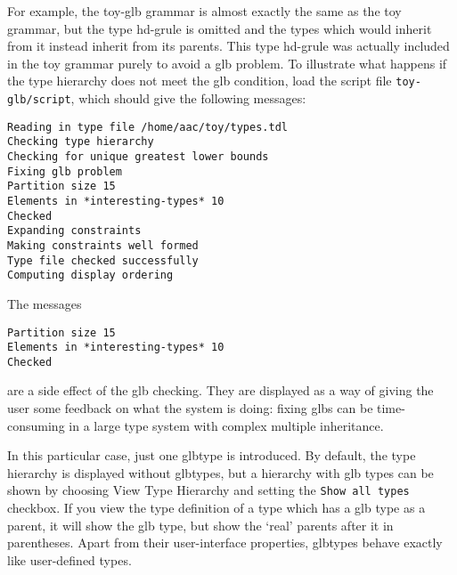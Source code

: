 \documentclass[12pt]{report}
\newcommand{\filename}[1]{{\tt #1}}
\newcommand{\lkbmenucommand}{{\bf}}
\begin{document}
For example, the toy-glb
grammar is almost exactly the same as the toy grammar, but the
type {\type hd-grule} is omitted and the types which would inherit
from it instead inherit from its parents.  This type {\type hd-grule}
was actually included in the toy grammar purely to
avoid a glb problem.  To illustrate what happens if the type hierarchy does not
meet the glb condition,
load the script file \filename{toy-glb/script}, which should give the following
messages:
\begin{verbatim}
Reading in type file /home/aac/toy/types.tdl
Checking type hierarchy
Checking for unique greatest lower bounds
Fixing glb problem
Partition size 15
Elements in *interesting-types* 10
Checked
Expanding constraints
Making constraints well formed
Type file checked successfully
Computing display ordering
\end{verbatim}
The messages 
\begin{verbatim}
Partition size 15
Elements in *interesting-types* 10
Checked
\end{verbatim}
are a side effect of the glb checking.  They are displayed as a way
of giving the user some feedback on what the system is doing:
fixing glbs can be time-consuming in a large type system with
complex multiple inheritance.

In this particular case, just one glbtype is introduced.
By default, the type hierarchy is displayed
without glbtypes, but a hierarchy with glb types
can be shown by choosing
{\lkbmenucommand View} {\lkbmenucommand Type Hierarchy} and setting the {\tt Show all types}
checkbox.
If you view the type definition of a type which has a glb type as a parent,
it will show the glb type, but show the `real' parents after it 
in parentheses.
Apart from their user-interface properties, 
glbtypes behave exactly like user-defined types.
\end{document}
